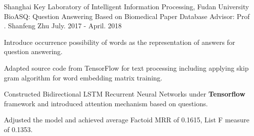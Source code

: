 \begin{cventries}
      \cventry
     {Shanghai Key Laboratory of Intelligent Information Processing, Fudan University} 
    {BioASQ: Question Answering Based on Biomedical Paper Database} %
    {Advisor: Prof . Shanfeng Zhu} %
    {July. 2017 - April. 2018} %
    {
      \begin{cvitems} %
	\item {Introduce occurrence possibility of words as the representation of answers for question answering.}
	\item {Adapted source code from TensorFlow for text processing including applying skip gram algorithm for word embedding matrix training.}
	\item {Constructed Bidirectional LSTM Recurrent Neural Networks under \textbf{Tensorflow} framework and introduced attention mechanism based on questions.}
	\item {Adjusted the model and achieved average Factoid MRR of 0.1615, List F measure of 0.1353.}
      \end{cvitems}
    }


    
\end{cventries}
